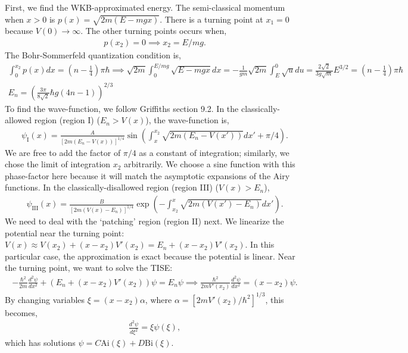 \documentclass[10pt]{article}
\newcommand{\1}{\mathbf 1}
\begin{document}
First, we find the WKB-approximated energy.
The semi-classical momentum when $x> 0$ is $p(x) = \sqrt{2m(E - mgx)}$.
There is a turning point at $x_1=0$ because $V(0) \to \infty$.
The other turning points occurs when,
\begin{align}
	p(x_2) = 0 \implies 
	x_2 = E/mg.
\end{align}
The Bohr-Sommerfeld quantization condition is,
\begin{gather}
	\int_0^{x_2} p(x) dx
	=
	\left(
		n - \frac{1}{4}
	\right)\pi \hbar
	\implies
	\sqrt{2m}
	\int_0^{E/mg}
	\sqrt{E - m g x}
	dx
	=
	-
	\frac{1}{gm}
	\sqrt{2m}
	\int_{E}^{0}
	\sqrt{u}
	du
	=
	\frac{2\sqrt{2}}{3g\sqrt{m}} E^{3/2}
	=
	\left(
		n - \frac{1}{4}
	\right) \pi \hbar\nonumber
	\\
	E_n = 
	\left(
		\frac{3\pi}{8\sqrt{2}}  \hbar g
		(4n-1)
	\right)^{2/3}
\end{gather}
To find the wave-function, we follow Griffiths section 9.2.
In the classically-allowed region (region I) ($E_n > V(x)$), the wave-function is,
\begin{align}
	\psi_\mathrm{I}(x) =
	\frac{A}{[2m(E_n - V(x))]^{1/4}}
	\sin(\int_x^{x_2} \sqrt{2m (E_n - V(x'))} dx' + \pi/4).
\end{align}
We are free to add the factor of $\pi/4$ as a constant of integration; similarly, we chose the limit of integration $x_2$ arbitrarily.
We choose a sine function with this phase-factor here because it will match the asymptotic expansions of the Airy functions.
In the classically-disallowed region (region III) ($V(x) > E_n$),
\begin{align}
	\psi_\mathrm{III}(x)
	=
	\frac{B}{[2m(V(x) - E_n)]^{1/4}}
	\exp(-\int_{x_2}^x \sqrt{2m(V(x') - E_n)} dx').
\end{align}
We need to deal with the `patching' region (region II) next.
We linearize the potential near the turning point: $V(x) \approx V(x_2) + (x-x_2) V'(x_2)
=
E_n + (x-x_2) V'(x_2)
$.
In this particular case, the approximation is exact because the potential is linear.
Near the turning point, we want to solve the TISE:
\begin{align}
	-\frac{\hbar^2}{2m}
	\frac{d^2\psi}{dx^2}
	+
	(E_n + (x-x_2)V'(x_2))
	\psi
	=
	E_n \psi
	\implies 
	\frac{\hbar^2}{2m V'(x_2)}
	\frac{d^2\psi}{dx^2}
	=
	(x-x_2)
	\psi.
\end{align}
By changing variables $\xi = (x-x_2)\alpha$, where $\alpha =[ 2mV'(x_2)/\hbar^2]^{1/3}$, this becomes,
\begin{align}
	\frac{d^2 \psi}{d\xi^2} = \xi \psi(\xi),
\end{align}
which has solutions $\psi = C\mathrm{Ai}(\xi) + D \mathrm{Bi}(\xi)$.
\end{document}
